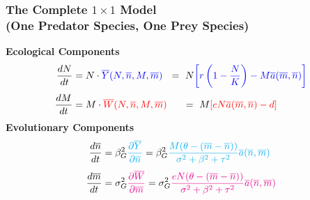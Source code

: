 \documentclass[10pt]{beamer}
\begin{document}
\begin{frame}
	\frametitle{The Complete $1\times1$ Model \\ (One Predator Species, One Prey Species)}
	{\bf Ecological Components}
	\begin{align*}
		\frac{dN}{dt} &= N\cdot {\color{blue}\overline{Y}(N, \overline{n}, M, \overline{m})}\ \ =\ N{\color{blue}\left[r\left(1 - \frac{N}{K}\right) - M\overline{a}(\overline{m}, \overline{n})\right]}\\[.1cm]
		\frac{dM}{dt} &= M\cdot {\color{red}\overline{W}(N, \overline{n}, M, \overline{m})}\ \ \ \ \ =\ M{\color{red}\left[eN\overline{a}(\overline{m}, \overline{n}) - d\right]}
	\end{align*}
	{\bf Evolutionary Components}
	\begin{align*}
		\frac{d\overline{n}}{dt} &= \beta_G^2{\color{cyan}\frac{\partial \overline{Y}}{\partial \overline{n}}} = \beta_G^2{\color{cyan}\frac{M(\theta - (\overline{m} - \overline{n}))}{\sigma^2 + \beta^2 + \tau^2} \overline{a}(\overline{n}, \overline{m})}\\[.1cm]
		\frac{d\overline{m}}{dt} &= \sigma_G^2{\color{magenta}\frac{\partial \overline{W}}{\partial \overline{m}}} = \sigma_G^2{\color{magenta}\frac{eN(\theta - (\overline{m} - \overline{n}))}{\sigma^2 + \beta^2 + \tau^2} \overline{a}(\overline{n}, \overline{m})}
	\end{align*}
\end{frame}
\end{document}
